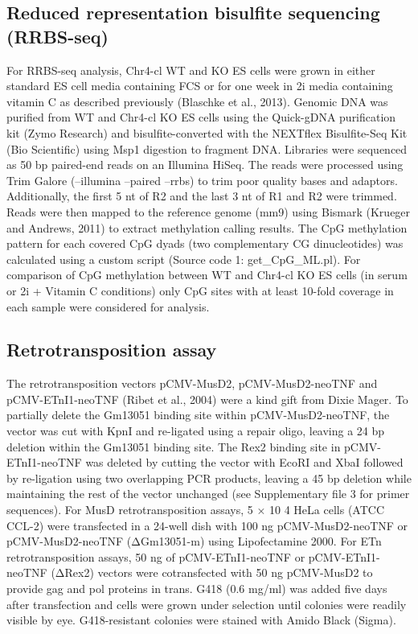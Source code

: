 \documentclass[11pt,a4paper]{article}
\begin{document}
\subsection{Reduced representation bisulfite sequencing (RRBS-seq)}

For RRBS-seq analysis, Chr4-cl WT and KO ES cells were grown in either standard ES cell media containing FCS or for one week in 2i media containing vitamin C as described previously (Blaschke et al., 2013). Genomic DNA was purified from WT and Chr4-cl KO ES cells using the Quick-gDNA purification kit (Zymo Research) and bisulfite-converted with the NEXTflex Bisulfite-Seq Kit (Bio Scientific) using Msp1 digestion to fragment DNA. Libraries were sequenced as 50 bp paired-end reads on an Illumina HiSeq. The reads were processed using Trim Galore (--illumina --paired –rrbs) to trim poor quality bases and adaptors. Additionally, the first 5 nt of R2 and the last 3 nt of R1 and R2 were trimmed. Reads were then mapped to the reference genome (mm9) using Bismark (Krueger and Andrews, 2011) to extract methylation calling results. The CpG methylation pattern for each covered CpG dyads (two complementary CG dinucleotides) was calculated using a custom script (Source code 1: get\_CpG\_ML.pl). For comparison of CpG methylation between WT and Chr4-cl KO ES cells (in serum or 2i + Vitamin C conditions) only CpG sites with at least 10-fold coverage in each sample were considered for analysis.

\subsection{Retrotransposition assay}

The retrotransposition vectors pCMV-MusD2, pCMV-MusD2-neoTNF and pCMV-ETnI1-neoTNF (Ribet et al., 2004) were a kind gift from Dixie Mager. To partially delete the Gm13051 binding site within pCMV-MusD2-neoTNF, the vector was cut with KpnI and re-ligated using a repair oligo, leaving a 24 bp deletion within the Gm13051 binding site. The Rex2 binding site in pCMV-ETnI1-neoTNF was deleted by cutting the vector with EcoRI and XbaI followed by re-ligation using two overlapping PCR products, leaving a 45 bp deletion while maintaining the rest of the vector unchanged (see Supplementary file 3 for primer sequences). For MusD retrotransposition assays, 5 × 10 4 HeLa cells (ATCC CCL-2) were transfected in a 24-well dish with 100 ng pCMV-MusD2-neoTNF or pCMV-MusD2-neoTNF (ΔGm13051-m) using Lipofectamine 2000. For ETn retrotransposition assays, 50 ng of pCMV-ETnI1-neoTNF or pCMV-ETnI1-neoTNF (ΔRex2) vectors were cotransfected with 50 ng pCMV-MusD2 to provide gag and pol proteins in trans. G418 (0.6 mg/ml) was added five days after transfection and cells were grown under selection until colonies were readily visible by eye. G418-resistant colonies were stained with Amido Black (Sigma).
\end{document}

